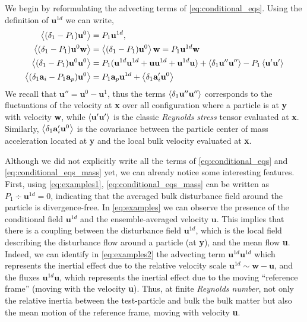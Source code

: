 We begin by reformulating the advecting terms of \ref{eq:conditional_eqs}.
Using the definition of $\textbf{u}^{1d}$ we can write, 
\begin{align}
    \label{eq:examples1}
    \avg{(\delta_1 - P_1) \textbf{u}^0}
    &= P_1 \textbf{u}^{1d},\\ 
    \avg{(\delta_1 - P_1)\textbf{u}^0 \textbf{w}}
    &= \avg{(\delta_1 - P_1)\textbf{u}^0 }\textbf{w} 
    = P_1\textbf{u}^{1d}\textbf{w} \\
    \label{eq:examples2}
    \avg{(\delta_1 - P_1)\textbf{u}^0 \textbf{u}^0}
    &= P_1 (\textbf{u}^{1d}\textbf{u}^{1d} + \textbf{u}\textbf{u}^{1d}+  \textbf{u}^{1d}\textbf{u})
    + \avg{\delta_1 \textbf{u}''\textbf{u}''}
    - P_1 \avg{ \textbf{u}'\textbf{u}'}
    \\
    \avg{(\delta_1\textbf{a}_i - P_1\textbf{a}_p) \textbf{u}^0}
    &=
    P_1\textbf{a}_p \textbf{u}^{1d}
    + \avg{\delta_1\textbf{a}_i' \textbf{u}^0} 
    \label{eq:examples}
\end{align}
We recall that $\textbf{u}'' = \textbf{u}^0 - \textbf{u}^1$, thus the terms $\left<\delta_1 \textbf{u}''\textbf{u}''\right>$ corresponds to the fluctuations of the velocity at \textbf{x} over all configuration where a particle is at \textbf{y} with velocity \textbf{w}, while $\left< \textbf{u}'\textbf{u}'\right>$ is the classic \textit{Reynolds stress} tensor evaluated at \textbf{x}. 
Similarly, $\left<\delta_1\textbf{a}_i' \textbf{u}^0\right>$ is the covariance between the particle center of mass acceleration located at \textbf{y} and the local bulk velocity evaluated at \textbf{x}. 


Although we did not explicitly write all the terms of \ref{eq:conditional_eqs} and \ref{eq:conditional_eqs_mass} yet, we can already notice some interesting features. 
First, using \ref{eq:examples1},  \ref{eq:conditional_eqs_mass} can be written as $P_1 \div \textbf{u}^{1d} =0$, indicating that the averaged bulk disturbance field around the particle is divergence-free.  
In \ref{eq:examples} we can observe the presence of the conditional field $\textbf{u}^{1d}$ and the ensemble-averaged velocity $\textbf{u}$. 
This implies that there is a coupling between the disturbance field $\textbf{u}^{1d}$, which is the local field describing the disturbance flow around a particle (at \textbf{y}), and the mean flow \textbf{u}.
Indeed, we can identify in \ref{eq:examples2} the advecting term $\textbf{u}^{1d}\textbf{u}^{1d}$ which represents the inertial effect due to the relative velocity scale $\textbf{u}^{1d} \sim \textbf{w}- \textbf{u}$, and the fluxes $\textbf{u}^{1d}\textbf{u}$, which represents the inertial effect due to the moving ``reference frame'' (moving with the velocity \textbf{u}). 
Thus, at finite \textit{Reynolds number}, not only the relative inertia between the test-particle and bulk the bulk matter but also the mean motion of the reference frame, moving with velocity \textbf{u}. 


